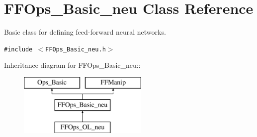 \section{FFOps\_\-Basic\_\-neu Class Reference}
\label{classFFOps__Basic__neu}
Basic class for defining feed-forward neural networks. 


{\tt \#include $<$FFOps\_\-Basic\_\-neu.h$>$}

Inheritance diagram for FFOps\_\-Basic\_\-neu::\begin{figure}[H]
\begin{center}
\leavevmode
\includegraphics[height=3cm]{classFFOps__Basic__neu}
\end{center}
\end{figure}
